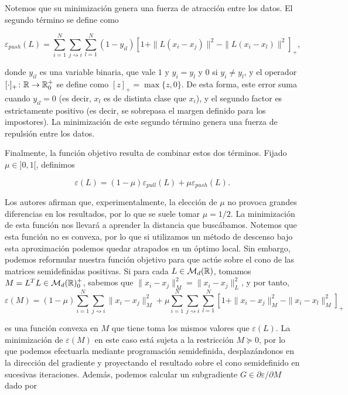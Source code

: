 \documentclass{book}
\newcommand{\istargetof}{\rightsquigarrow}
\begin{document}
Notemos que su minimización genera una fuerza de atracción entre los datos. El segundo término se define como

\[ \varepsilon_{push}(L) = \sum_{i=1}^{N}\sum_{j\istargetof i}\sum_{l=1}^{N} (1 - y_{il})[1 + \|L(x_i-x_j)\|^2 - \|L(x_i-x_l)\|^2]_{+}, \]

donde $y_{il}$ es una variable binaria, que vale $1$ y $y_i = y_l$ y $0$ si $y_i \ne y_l$, y el operador $[ \cdot ]_{+}\colon  \mathbb{R} \to \mathbb{R}^+_0$ se define como $[z]_{+} = \max\{z,0\}$. De esta forma, este error suma cuando $y_{il} = 0$ (es decir, $x_l$ es de distinta clase que $x_i$), y el segundo factor es estrictamente positivo (es decir, se sobrepasa el margen definido para los impostores). La minimización de este segundo término genera una fuerza de repulsión entre los datos.

Finalmente, la función objetivo resulta de combinar estos dos términos. Fijado $\mu \in ]0,1[$, definimos

\begin{equation} \label{eq:lmnn:L}
\varepsilon(L) = (1 - \mu)\varepsilon_{pull}(L) + \mu\varepsilon_{push}(L).
\end{equation}

Los autores afirman que, experimentalmente, la elección de $\mu$ no provoca grandes diferencias en los resultados, por lo que se suele tomar $\mu = 1/2$. La minimización de esta función nos llevará a aprender la distancia que buscábamos. Notemos que esta función no es convexa, por lo que si utilizamos un método de descenso bajo esta aproximación podemos quedar atrapados en un óptimo local. Sin embargo, podemos reformular nuestra función objetivo para que actúe sobre el cono de las matrices semidefinidas positivas. Si para cada $L \in \mathcal{M}_d(\mathbb{R})$, tomamos $M = L^TL \in \mathcal{M}_d(\mathbb{R})^+_0$, sabemos que $\|x_i-x_j\|_M^2 = \|x_i - x_j\|_L^2$, y por tanto,
\begin{equation} \label{eq:lmnn:M}
 \varepsilon(M) = (1-\mu) \sum_{i=1}^{N}\sum_{j\istargetof i} \|x_i - x_j\|_M^2 + \mu \sum_{i=1}^{N}\sum_{j\istargetof i}\sum_{l=1}^N [ 1 + \|x_i - x_j\|_M^2 - \|x_i - x_l\|_M^2]_{+}
\end{equation}

es una función convexa en $M$ que tiene toma los mismos valores que $\varepsilon(L)$. La minimización de $\varepsilon(M)$ en este caso está sujeta a la restricción $M \succeq 0$, por lo que podemos efectuarla mediante programación semidefinida, desplazándonos en la dirección del gradiente y proyectando el resultado sobre el cono semidefinido en sucesivas iteraciones. Además, podemos calcular un subgradiente $G \in \partial \varepsilon / \partial M$ dado por
\end{document}
